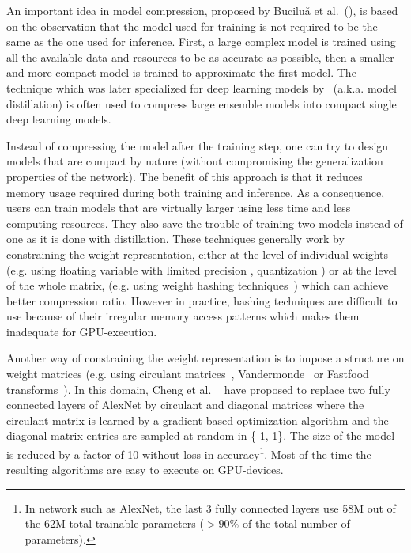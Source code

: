 \documentclass[runningheads]{llncs}
\begin{document}
An important idea in model compression, proposed by Buciluǎ et al.~(\cite{bucilua2006model}), is based on the observation that the model used for training is not required to be the same as the one used for inference. First, a large complex model is trained using all the available data and resources  to be as accurate as possible, then a smaller and more compact model is trained to approximate the first model. The technique which was later specialized for deep learning models by~\cite{44873} (a.k.a. model distillation) is often used to compress large ensemble models into compact single deep learning models.

Instead of compressing the model after the training step, one can try to design models that are compact by nature (without compromising the generalization properties of the network). The benefit of this approach is that it reduces  memory usage required during both training and inference. As a consequence, users can train models that are virtually larger using less time and less computing resources. They also save the trouble of training two models instead of one as it is done with distillation. These techniques generally work by constraining the weight representation, either at the level of individual weights (e.g. using floating variable with limited precision \cite{Gupta:2015:DLL:3045118.3045303}, quantization \cite{Courbariaux:2015:BTD:2969442.2969588,DBLP:journals/corr/MellempudiKM0KD17,rastegariECCV16}) or  at the level of the whole matrix, (e.g. using weight hashing techniques~\cite{Chen:2015:CNN:3045118.3045361}) which can achieve better compression ratio. However in practice, hashing techniques are difficult to use because of their irregular memory access patterns which makes them inadequate for GPU-execution.

Another way of constraining the weight representation is to impose a structure on weight matrices (e.g. using circulant matrices~\cite{7410684,NIPS2015_5869}, Vandermonde~\cite{NIPS2015_5869} or Fastfood transforms~\cite{7410530}). In this domain, Cheng et al. ~\cite{7410684} have proposed to replace two fully connected layers of AlexNet by circulant and diagonal matrices where the circulant matrix is learned by a gradient based optimization algorithm and the diagonal matrix entries are sampled at random in \{-1, 1\}. The size of the model is reduced by a factor of 10 without loss in accuracy\footnote{In network such as AlexNet, the last 3 fully connected layers use 58M out of the 62M total trainable parameters ($> 90\%$ of the total number of parameters).}. Most of the time the resulting algorithms are easy to execute on GPU-devices. 
\end{document}
